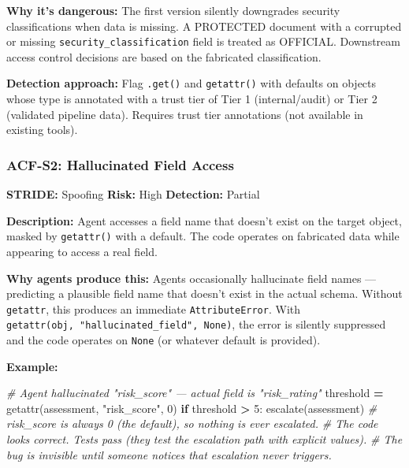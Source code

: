 \documentclass[a4paper,11pt]{report}
\newenvironment{Shaded}{\begin{snugshade}}{\end{snugshade}}
\newcommand{\BuiltInTok}[1]{#1}
\newcommand{\CommentTok}[1]{\textcolor[rgb]{0.56,0.35,0.01}{\textit{#1}}}
\newcommand{\ControlFlowTok}[1]{\textcolor[rgb]{0.13,0.29,0.53}{\textbf{#1}}}
\newcommand{\DecValTok}[1]{\textcolor[rgb]{0.00,0.00,0.81}{#1}}
\newcommand{\NormalTok}[1]{#1}
\newcommand{\OperatorTok}[1]{\textcolor[rgb]{0.81,0.36,0.00}{\textbf{#1}}}
\newcommand{\StringTok}[1]{\textcolor[rgb]{0.31,0.60,0.02}{#1}}
\begin{document}
\textbf{Why it's dangerous:} The first version silently downgrades
security classifications when data is missing. A PROTECTED document with
a corrupted or missing \texttt{security\_classification} field is
treated as OFFICIAL. Downstream access control decisions are based on
the fabricated classification.

\textbf{Detection approach:} Flag \texttt{.get()} and \texttt{getattr()}
with defaults on objects whose type is annotated with a trust tier of
Tier 1 (internal/audit) or Tier 2 (validated pipeline data). Requires
trust tier annotations (not available in existing tools).

\hypertarget{acf-s2-hallucinated-field-access}{%
\subsubsection{ACF-S2: Hallucinated Field
Access}\label{acf-s2-hallucinated-field-access}}

\textbf{STRIDE:} Spoofing \textbar{} \textbf{Risk:} High \textbar{}
\textbf{Detection:} Partial

\textbf{Description:} Agent accesses a field name that doesn't exist on
the target object, masked by \texttt{getattr()} with a default. The code
operates on fabricated data while appearing to access a real field.

\textbf{Why agents produce this:} Agents occasionally hallucinate field
names --- predicting a plausible field name that doesn't exist in the
actual schema. Without \texttt{getattr}, this produces an immediate
\texttt{AttributeError}. With
\texttt{getattr(obj,\ "hallucinated\_field",\ None)}, the error is
silently suppressed and the code operates on \texttt{None} (or whatever
default is provided).

\textbf{Example:}

\begin{Shaded}
\begin{Highlighting}[]
\CommentTok{\# Agent hallucinated "risk\_score" — actual field is "risk\_rating"}
\NormalTok{threshold }\OperatorTok{=} \BuiltInTok{getattr}\NormalTok{(assessment, }\StringTok{"risk\_score"}\NormalTok{, }\DecValTok{0}\NormalTok{)}
\ControlFlowTok{if}\NormalTok{ threshold }\OperatorTok{\textgreater{}} \DecValTok{5}\NormalTok{:}
\NormalTok{    escalate(assessment)}
\CommentTok{\# risk\_score is always 0 (the default), so nothing is ever escalated.}
\CommentTok{\# The code looks correct. Tests pass (they test the escalation path with explicit values).}
\CommentTok{\# The bug is invisible until someone notices that escalation never triggers.}
\end{Highlighting}
\end{Shaded}
\end{document}
